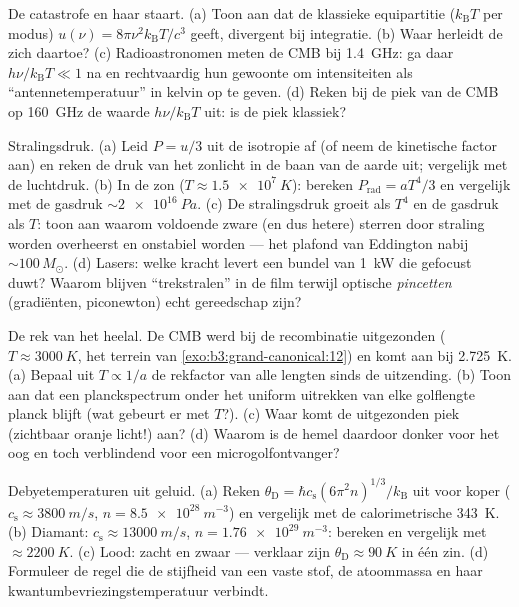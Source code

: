 \begin{exercise}[$\star$]\label{exo:b3:photons-phonons:4}
De catastrofe en haar staart. (a) Toon aan dat de klassieke equipartitie
($k_{\text{B}}T$ per modus) $u(\nu) =
8\pi\nu^2k_{\text{B}}T/c^3$ geeft,
divergent bij integratie. (b) Waar herleidt de  zich
daartoe? (c) Radioastronomen meten de CMB bij \qty{1.4}{GHz}: ga daar
$h\nu/k_{\text{B}}T \ll 1$ na en rechtvaardig hun gewoonte om intensiteiten
als ``antennetemperatuur'' in kelvin op te geven. (d) Reken bij de piek van
de CMB op \qty{160}{GHz} de waarde $h\nu/k_{\text{B}}T$ uit: is de piek
klassiek?
\end{exercise}

\begin{exercise}[$\star\star$]\label{exo:b3:photons-phonons:5}
Stralingsdruk. (a) Leid $P = u/3$ uit de isotropie af (of neem de
kinetische factor aan) en reken de druk van het zonlicht in de baan van de
aarde uit; vergelijk met de luchtdruk. (b) In de zon ($T \approx \qty{1.5e7}{K}$): bereken $P_{\text{rad}} =
aT^4/3$ en vergelijk met de
gasdruk $\sim\qty{2e16}{Pa}$. (c) De stralingsdruk groeit als $T^4$ en de
gasdruk als $T$: toon aan waarom voldoende zware (en dus hetere) sterren
door straling worden overheerst en onstabiel worden --- het plafond van
Eddington nabij $\sim100\,M_\odot$. (d) Lasers: welke kracht levert een
bundel van \qty{1}{kW} die gefocust duwt? Waarom blijven ``trekstralen''
in de film terwijl optische \emph{pincetten} (gradiënten, piconewton) echt
gereedschap zijn?
\end{exercise}

\begin{exercise}[$\star\star$]\label{exo:b3:photons-phonons:6}
De rek van het heelal. De CMB werd bij de recombinatie uitgezonden ($T \approx \qty{3000}{K}$, het terrein van
\cref{exo:b3:grand-canonical:12}) en komt aan bij \qty{2.725}{K}. (a)
Bepaal uit $T \propto
1/a$ de rekfactor van alle lengten sinds de
uitzending. (b) Toon aan dat een planckspectrum onder het uniform
uitrekken van elke golflengte planck blijft (wat gebeurt er met $T$?). (c)
Waar komt de uitgezonden piek (zichtbaar oranje licht!) aan? (d) Waarom is
de hemel daardoor donker voor het oog en toch verblindend voor een
microgolfontvanger?
\end{exercise}

\begin{exercise}[$\star\star$]\label{exo:b3:photons-phonons:7}
Debyetemperaturen uit geluid. (a) Reken $\theta_{\text{D}} =
\hbar c_{\text{s}}(6\pi^2n)^{1/3}/k_{\text{B}}$ uit voor koper
($c_{\text{s}} \approx \qty{3800}{m/s}$, $n =
\qty{8.5e28}{m^{-3}}$) en
vergelijk met de calorimetrische \qty{343}{K}. (b) Diamant: $c_{\text{s}} \approx
\qty{13000}{m/s}$, $n = \qty{1.76e29}{m^{-3}}$: bereken en
vergelijk met $\approx\qty{2200}{K}$. (c) Lood: zacht en zwaar --- verklaar
zijn $\theta_{\text{D}} \approx \qty{90}{K}$ in één zin. (d) Formuleer de
regel die de stijfheid van een vaste stof, de atoommassa en haar
kwantumbevriezingstemperatuur verbindt.
\end{exercise}

